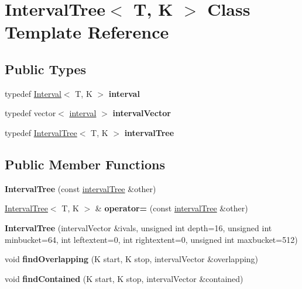 \hypertarget{class_interval_tree}{}\section{Interval\+Tree$<$ T, K $>$ Class Template Reference}
\label{class_interval_tree}
\subsection*{Public Types}
\begin{DoxyCompactItemize}
\item 
\mbox{\label{class_interval_tree_adec8bc7b9cac07dae3fbaa9c6cd0ed24}} 
typedef \hyperlink{class_interval}{Interval}$<$ T, K $>$ {\bfseries interval}
\item 
\mbox{\label{class_interval_tree_a4b0030e4cb75e59e2f13b78700c0eccb}} 
typedef vector$<$ \hyperlink{class_interval}{interval} $>$ {\bfseries interval\+Vector}
\item 
\mbox{\label{class_interval_tree_a04e97a1d4fafe4678bfcfcc4fdfe82d4}} 
typedef \hyperlink{class_interval_tree}{Interval\+Tree}$<$ T, K $>$ {\bfseries interval\+Tree}
\end{DoxyCompactItemize}
\subsection*{Public Member Functions}
\begin{DoxyCompactItemize}
\item 
\mbox{\label{class_interval_tree_a91f223d02854a54a887c9e67064e6cfe}} 
{\bfseries Interval\+Tree} (const \hyperlink{class_interval_tree}{interval\+Tree} \&other)
\item 
\mbox{\label{class_interval_tree_a02be541cbb6107e3b4d869497cfe3192}} 
\hyperlink{class_interval_tree}{Interval\+Tree}$<$ T, K $>$ \& {\bfseries operator=} (const \hyperlink{class_interval_tree}{interval\+Tree} \&other)
\item 
\mbox{\label{class_interval_tree_a1ae0dab1deba6f1802f256566c7df11c}} 
{\bfseries Interval\+Tree} (interval\+Vector \&ivals, unsigned int depth=16, unsigned int minbucket=64, int leftextent=0, int rightextent=0, unsigned int maxbucket=512)
\item 
\mbox{\label{class_interval_tree_a12cd2eabb681caa32b29a9e9c9c74b95}} 
void {\bfseries find\+Overlapping} (K start, K stop, interval\+Vector \&overlapping)
\item 
\mbox{\label{class_interval_tree_a9c5c426d500b5cd9d98a2d6f4ce9bd10}} 
void {\bfseries find\+Contained} (K start, K stop, interval\+Vector \&contained)
\end{DoxyCompactItemize}

